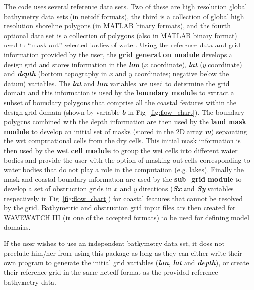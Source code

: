 \documentclass[12pt]{article}
\newcommand{\pb}{\strut \vfill \pagebreak}
\newcommand{\bpage}{\vfill \pagebreak \strut

\vspace{2.5in} \centerline{This page is intentionally left blank.}}
\begin{document}
The code uses several reference data sets. Two of these are high resolution global bathymetry data sets (in netcdf formats), the third is a collection of global high resolution shoreline polygons (in MATLAB binary formats), and the fourth optional data set is a collection of polygons (also in MATLAB binary format) used to ``mask out'' selected bodies of water. Using the reference data and grid information provided by the user, the {\bf grid generation module} develops a design grid and stores information in the \textbf{\textit{lon}} ($x $ coordinate), \textbf {\textit{lat}} ($y $ coordinate) and \textbf{\textit{depth}} (bottom topography in $x$ and $y$ coordinates; negative below the datum) variables. The \textbf{\textit{lat}} and \textbf{\textit{lon}} variables are used to determine the grid domain and this information is used by the {\bf boundary module} to extract a subset of boundary polygons that comprise all the coastal features within the design grid domain (shown by variable \textbf{\textit{b}} in Fig~\ref{fig:flow_chart}). The boundary polygons combined with the depth information are then used by the {\bf land mask module} to develop an initial set of masks (stored in the 2D array \textbf{\textit{m}}) separating the wet computational cells from the dry cells. This initial mask information is then used by the {\bf wet cell module} to group the wet cells into different water bodies and provide the user with the option of masking out cells corresponding to water bodies that do not play a role in the computation (e.g. lakes). Finally the mask and coastal boundary information are used by the {\bf sub$-$grid module} to develop a set of obstruction grids in $x$ and $y$ directions (\textbf{\textit{Sx}} and \textbf{\textit{Sy}} variables respectively in Fig~\ref{fig:flow_chart}) for coastal features that cannot be resolved by the grid. Bathymetric and obstruction grid input files are then created for WAVEWATCH III (in one of the accepted formats) to be used for defining model domains.

If the user wishes to use an independent bathymetry data set, it does not preclude him/her from using this package as long as they can either write their own program to generate the initial grid variables (\textbf{\textit{lon}}, \textbf{\textit{lat}} and \textbf{\textit{depth}}), or create their reference grid in the same netcdf format as the provided reference bathymetry data. 

\pb
\end{document}

